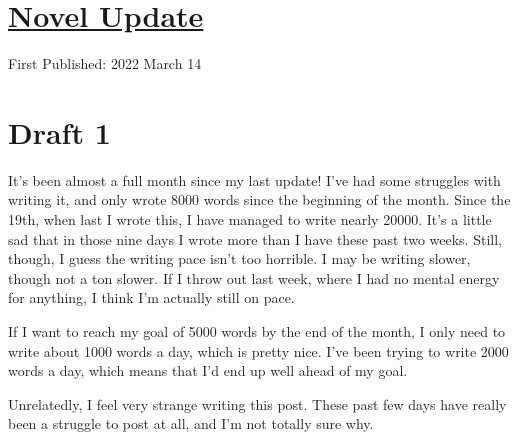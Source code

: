 \documentclass[12pt]{article}[titlepage]
\newcommand{\1}{\={a}}
\newcommand{\2}{\={e}}
\newcommand{\3}{\={\i}}
\newcommand{\4}{\=o}
\newcommand{\5}{\=u}
\newcommand{\6}{\={A}}
\renewcommand{\,}{\textsuperscript{,}}
\begin{document}
\doublespacing
\section{\href{novel-update-4.html}{Novel Update}}
First Published: 2022 March 14

\section{Draft 1}
It's been almost a full month since my last update!
I've had some struggles with writing it, and only wrote 8000 words since the beginning of the month.
Since the 19th, when last I wrote this, I have managed to write nearly 20000.
It's a little sad that in those nine days I wrote more than I have these past two weeks.
Still, though, I guess the writing pace isn't too horrible.
I may be writing slower, though not a ton slower.
If I throw out last week, where I had no mental energy for anything, I think I'm actually still on pace.

If I want to reach my goal of 5000 words by the end of the month, I only need to write about 1000 words a day, which is pretty nice.
I've been trying to write 2000 words a day, which means that I'd end up well ahead of my goal.

Unrelatedly, I feel very strange writing this post.
These past few days have really been a struggle to post at all, and I'm not totally sure why.
\end{document}
